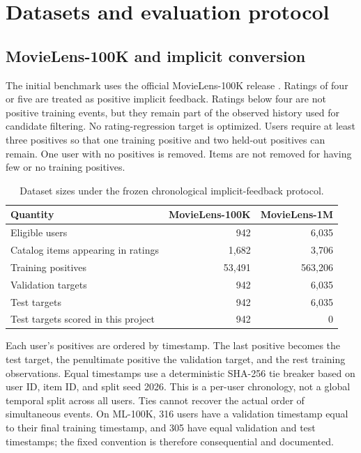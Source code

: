 \section{Datasets and evaluation protocol}
\label{sec:data}
\subsection{MovieLens-100K and implicit conversion}
The initial benchmark uses the official MovieLens-100K release
\citep{harper2015movielens}. Ratings of four or five are treated as positive
implicit feedback. Ratings below four are not positive training events, but
they remain part of the observed history used for candidate filtering. No
rating-regression target is optimized. Users require at least three positives
so that one training positive and two held-out positives can remain. One user
with no positives is removed. Items are not removed for having few or no
training positives.

\begin{table}[tbp]\centering
\caption{Dataset sizes under the frozen chronological implicit-feedback protocol.}
\label{tab:data}
\begin{tabular}{lrr}\toprule
Quantity & MovieLens-100K & MovieLens-1M \\\midrule
Eligible users & 942 & 6,035 \\
Catalog items appearing in ratings & 1,682 & 3,706 \\
Training positives & 53,491 & 563,206 \\
Validation targets & 942 & 6,035 \\
Test targets & 942 & 6,035 \\
Test targets scored in this project & 942 & 0 \\
\bottomrule\end{tabular}
\end{table}

Each user's positives are ordered by timestamp. The last positive becomes
the test target, the penultimate positive the validation target, and the rest
training observations. Equal timestamps use a deterministic SHA-256 tie breaker
based on user ID, item ID, and split seed 2026. This is a per-user chronology,
not a global temporal split across all users. Ties cannot recover the actual
order of simultaneous events. On ML-100K, 316 users have a validation timestamp
equal to their final training timestamp, and 305 have equal validation and test
timestamps; the fixed convention is therefore consequential and documented.

